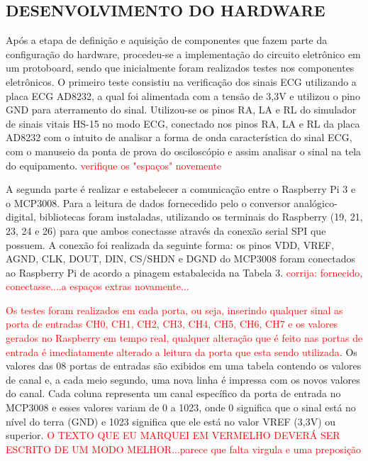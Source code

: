\documentclass[12pt, a4paper]{article}
\begin{document}
\subsection{DESENVOLVIMENTO DO HARDWARE}
\hspace*{0.8cm}Após a etapa de definição e aquisição de componentes que fazem parte da configuração do hardware, procedeu-se a implementação do circuito eletrônico em um protoboard, sendo que inicialmente foram realizados testes nos componentes eletrônicos. O primeiro teste consistiu na verificação dos sinais ECG utilizando a placa ECG AD8232, a qual foi alimentada com a tensão de 3,3V e utilizou o  pino GND para aterramento do sinal. Utilizou-se os pinos RA, LA e RL do simulador de sinais vitais HS-15 no modo ECG, conectado nos pinos RA, LA e RL da placa AD8232 com o intuito de analisar a forma de onda característica do sinal ECG, com o manuseio da ponta de prova do osciloscópio e assim analisar o sinal na tela do equipamento. \textcolor{red}{verifique os "espaços" novemente}


A segunda parte é realizar e estabelecer a comunicação entre o Raspberry Pi 3 e o MCP3008. Para a leitura de dados fornecedido pelo o conversor analógico-digital, bibliotecas foram instaladas, utilizando os terminais do Raspberry (19, 21, 23, 24 e 26) para que ambos conectasse através da conexão serial SPI que possuem. A conexão foi realizada da seguinte forma: os pinos VDD, VREF, AGND, CLK, DOUT, DIN, CS/SHDN e DGND do MCP3008 foram conectados ao Raspberry Pi de acordo  a pinagem estabalecida na Tabela 3. \textcolor{red}{corrija: fornecido, conectasse....a espaços extras novamente...}

\textcolor{red}{Os testes foram realizados em cada porta, ou seja, inserindo qualquer sinal as porta de entradas CH0, CH1, CH2, CH3, CH4, CH5, CH6, CH7 e os valores gerados no Raspberry em tempo real, qualquer alteração que é feito nas portas de entrada é imediatamente alterado a leitura da porta que esta sendo utilizada}. Os valores das 08 portas de entradas são exibidos em uma tabela contendo os valores de canal e, a cada meio segundo, uma nova linha é impressa com os novos valores do canal. Cada coluna representa um canal específico da porta de entrada no MCP3008 e esses valores variam de 0 a 1023, onde 0 significa que o sinal está no nível do terra (GND) e 1023 significa que ele está no valor VREF (3,3V) ou superior. \textcolor{red}{O TEXTO QUE EU MARQUEI EM VERMELHO DEVERÁ SER ESCRITO DE UM MODO MELHOR...parece que falta virgula e uma preposição}
\end{document}
